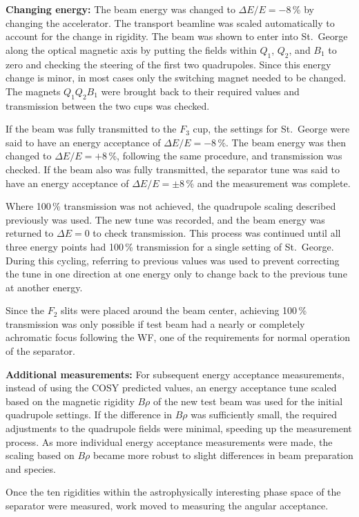 \textbf{Changing energy:}
The beam energy was changed to $\Delta E/E = -8$\,\% by changing the
accelerator. The transport beamline was scaled automatically to account
for the change in rigidity. The beam was shown to enter into St.\ George
along the optical magnetic axis by putting the fields within $Q_1$,
$Q_2$, and $B_1$ to zero and checking the steering of the first two
quadrupoles. Since this energy change is minor, in most cases only the
switching magnet needed to be changed. The magnets $Q_1Q_2B_1$ were
brought back to their required values and transmission between the two
cups was checked.

If the beam was fully transmitted to the $F_3$ cup, the settings for
St.\ George were said to have an energy acceptance of $\Delta E/E =
-8$\,\%. The beam energy was then changed to $\Delta E/E = + 8$\,\%,
following the same procedure, and transmission was checked. If the beam
also was fully transmitted, the separator tune was said to have an
energy acceptance of $\Delta E/E = \pm 8$\,\% and the measurement was
complete.

Where 100\,\% transmission was not achieved, the quadrupole scaling
described previously was used. The new tune was recorded, and the beam
energy was returned to $\Delta E = 0$ to check transmission. This
process was continued until all three energy points had 100\,\%
transmission for a single setting of St.\ George. During this cycling,
referring to previous values was used to prevent correcting the tune in
one direction at one energy only to change back to the previous tune at
another energy.

Since the $F_2$ slits were placed around the beam center, achieving
100\,\% transmission was only possible if test beam had a nearly or
completely achromatic focus following the WF, one of the requirements
for normal operation of the separator.

\textbf{Additional measurements:}
For subsequent energy acceptance measurements, instead of using the COSY
predicted values, an energy acceptance tune scaled based on the magnetic
rigidity $B\rho$ of the new test beam was used for the initial
quadrupole settings. If the difference in $B\rho$ was sufficiently
small, the required adjustments to the quadrupole fields were minimal,
speeding up the measurement process. As more individual energy
acceptance measurements were made, the scaling based on $B\rho$ became
more robust to slight differences in beam preparation and species.

Once the ten rigidities within the astrophysically interesting phase
space of the separator were measured, work moved to measuring the
angular acceptance.


